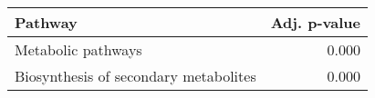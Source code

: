 \begin{tabular}{lr}
\toprule
                               Pathway &  Adj. p-value \\
\midrule
                    Metabolic pathways &         0.000 \\
 Biosynthesis of secondary metabolites &         0.000 \\
\bottomrule
\end{tabular}
